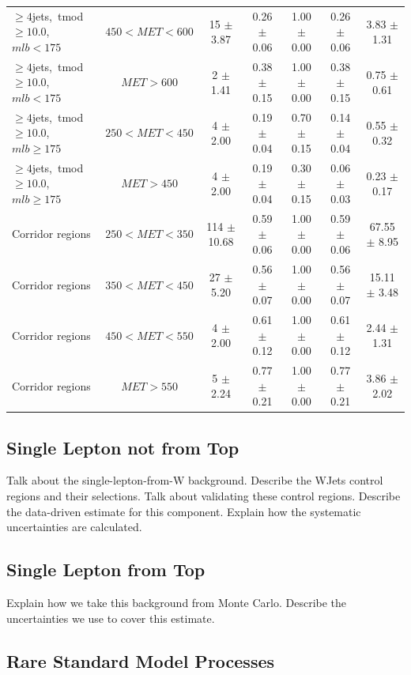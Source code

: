 \begin{table}
{\begin{tabular}{|l|c|c|c|c|c|c|}
 $\ge4$jets,~tmod$\ge10.0$,~$mlb<175$ & $450<MET<600$  & 15 $\pm$ 3.87  & 0.26 $\pm$ 0.06  & 1.00 $\pm$ 0.00 & 0.26 $\pm$ 0.06  & 3.83 $\pm$ 1.31  \\
 $\ge4$jets,~tmod$\ge10.0$,~$mlb<175$ & $MET>600$  & 2 $\pm$ 1.41  & 0.38 $\pm$ 0.15  & 1.00 $\pm$ 0.00 & 0.38 $\pm$ 0.15  & 0.75 $\pm$ 0.61  \\
\hline
 $\ge4$jets,~tmod$\ge10.0$,~$mlb\ge175$ & $250<MET<450$  & 4 $\pm$ 2.00  & 0.19 $\pm$ 0.04  & 0.70 $\pm$ 0.15 & 0.14 $\pm$ 0.04  & 0.55 $\pm$ 0.32  \\
 $\ge4$jets,~tmod$\ge10.0$,~$mlb\ge175$ & $MET>450$  & 4 $\pm$ 2.00  & 0.19 $\pm$ 0.04  & 0.30 $\pm$ 0.15 & 0.06 $\pm$ 0.03  & 0.23 $\pm$ 0.17  \\
\hline
Corridor regions & $250<MET<350$  & 114 $\pm$ 10.68  & 0.59 $\pm$ 0.06 & 1.00 $\pm$ 0.00 & 0.59 $\pm$ 0.06  & 67.55 $\pm$ 8.95  \\
Corridor regions & $350<MET<450$  &  27 $\pm$ 5.20   & 0.56 $\pm$ 0.07 & 1.00 $\pm$ 0.00 & 0.56 $\pm$ 0.07  & 15.11 $\pm$ 3.48  \\
Corridor regions & $450<MET<550$  &   4 $\pm$ 2.00   & 0.61 $\pm$ 0.12 & 1.00 $\pm$ 0.00 & 0.61 $\pm$ 0.12  &  2.44 $\pm$ 1.31  \\
Corridor regions & $MET>550$      &   5 $\pm$ 2.24   & 0.77 $\pm$ 0.21 & 1.00 $\pm$ 0.00 & 0.77 $\pm$ 0.21  &  3.86 $\pm$ 2.02  \\
\hline
\end{tabular}
}
\end{table}

\subsection{Single Lepton not from Top}
\label{ssec:stop:1lw}

Talk about the single-lepton-from-W background.
Describe the WJets control regions and their selections.
Talk about validating these control regions.
Describe the data-driven estimate for this component.
Explain how the systematic uncertainties are calculated.

\subsection{Single Lepton from Top}
\label{ssec:stop:1ltop}

Explain how we take this background from Monte Carlo.
Describe the uncertainties we use to cover this estimate.

\subsection{Rare Standard Model Processes}
\label{ssec:stop:rarebkg}

